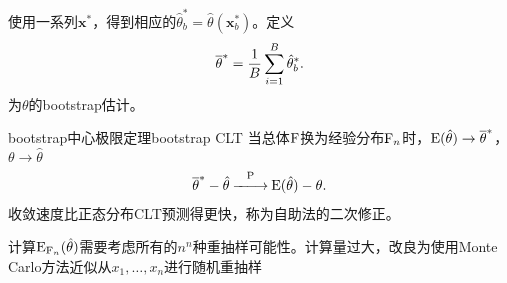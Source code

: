 使用一系列$\bm x^\ast$，得到相应的$\hat\theta_b^\ast=\hat\theta(\bm x_b^\ast)$。定义
\[
	\overline{\theta}^\ast=\frac1B\sum_{i=1}^B\hat\theta_b^\ast.
\]
为$\theta$的bootstrap估计。
\begin{theorem}{bootstrap中心极限定理}{bootstrap CLT}
	当总体$\operatorname{F} $换为经验分布$\operatorname{F}_n $时，$\operatorname{E}(\hat\theta)\to\overline{\theta}^\ast$，$\theta\to\hat\theta$
	\begin{align}
		\overline{\theta}^\ast-\hat\theta\overset{\operatorname{P}}{-\hspace{-4pt}-\hspace{-5pt}\longrightarrow}\operatorname{E}(\hat\theta)-\theta.
	\end{align}
	收敛速度比正态分布CLT预测得更快，称为自助法的二次修正。
\end{theorem}
计算$\operatorname{E}_{\operatorname{F}_n}(\hat\theta)$需要考虑所有的$n^n$种重抽样可能性。计算量过大，改良为使用Monte Carlo方法近似从$ x_1, \ldots, x_n $进行随机重抽样